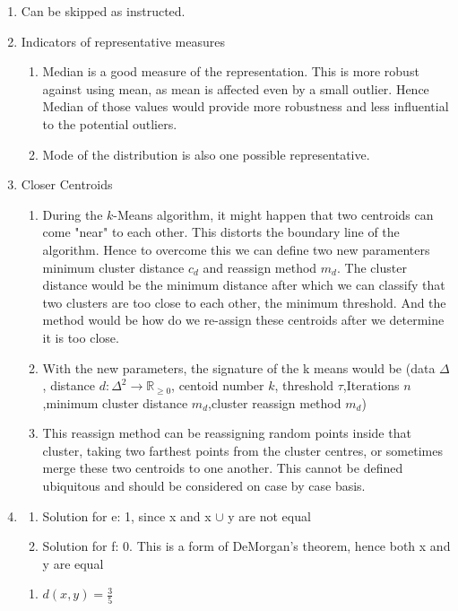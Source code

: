 \documentclass{article}
\begin{document}
\begin{enumerate}
\begin{enumerate}
\end{enumerate}
\item Can be skipped as instructed.
\item Indicators of representative measures
\begin{enumerate}
\item Median is a good measure of the representation. This is more robust against using mean, as mean is affected even by a small outlier. Hence Median of those values would provide more robustness and less influential to the potential outliers.
\item Mode of the distribution is also one possible representative.
\end{enumerate}
\item Closer Centroids
\begin{enumerate}
\item During the $k$-Means algorithm, it might happen that two centroids can come "near" to each other. This distorts the boundary line of the algorithm. Hence to overcome this we can define two new paramenters minimum cluster distance $c_d$ and reassign method $m_d$. The cluster distance would be the minimum distance after which we can classify that two clusters are too close to each other, the minimum threshold. And the method would be how do we re-assign these centroids after we determine it is too close.
\item With the new parameters, the signature of the k means would be (\textsf{data} $\Delta$, distance $d:\Delta^2\rightarrow \mathbb{R}_{\geq 0}$, \textsf{centoid number} $k$, \textsf{threshold} $\tau$,\textsf{Iterations} $n$,\textsf{minimum cluster distance} $m_d$,\textsf{cluster reassign method} $m_d$)
\item  This reassign method can be reassigning random points inside that cluster, taking two farthest points from the cluster centres, or sometimes merge these two centroids to one another. This cannot be defined ubiquitous and should be considered on case by case basis.
\end{enumerate}
\item
\begin{enumerate}
\item Solution for e: 1, since x and x $\cup$ y are not equal
\item Solution for f: 0. This is a form of DeMorgan's theorem, hence both x and y are equal
\end{enumerate}
\begin{enumerate}
\item $d(x,y) = \frac{3}{5}$

\end{enumerate}
\end{enumerate}
\end{document}
